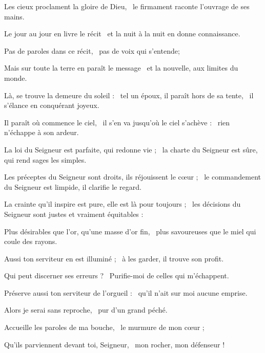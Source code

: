 \item Les cieux proclament la gloire de Dieu,~\psstar{} le firmament raconte l'ouvrage de ses mains.
\item Le jour au jour en livre le récit~\psstar{} et la nuit à la nuit en donne connaissance.
\item Pas de paroles dans ce récit,~\psstar{} pas de voix qui s'entende;
\item Mais sur toute la terre en paraît le message~\psstar{} et la nouvelle, aux limites du monde. 
\item Là, se trouve la demeure du soleil :~\pscross{} tel un époux, il paraît hors de sa tente,~\psstar{} il s'élance en conquérant joyeux.
\item Il paraît où commence le ciel,~\pscross{} il s'en va jusqu'où le ciel s'achève :~\psstar{} rien n'échappe à son ardeur.
\item La loi du Seigneur est parfaite, qui redonne vie ;~\psstar{} la charte du Seigneur est sûre, qui rend sages les simples.
\item Les préceptes du Seigneur sont droits, ils réjouissent le cœur ;~\psstar{} le commandement du Seigneur est limpide, il clarifie le regard.
\item La crainte qu'il inspire est pure, elle est là pour toujours ;~\psstar{} les décisions du Seigneur sont justes et vraiment équitables :
\item Plus désirables que l'or, qu'une masse d'or fin,~\psstar{} plus savoureuses que le miel qui coule des rayons.
\item Aussi ton serviteur en est illuminé ;~\psstar{} à les garder, il trouve son profit.
\item Qui peut discerner ses erreurs ?~\psstar{} Purifie-moi de celles qui m'échappent.
\item Préserve aussi ton serviteur de l'orgueil :~\psstar{} qu'il n'ait sur moi aucune emprise.
\item Alors je serai sans reproche,~\psstar{} pur d'un grand péché.
\item Accueille les paroles de ma bouche,~\psstar{} le murmure de mon cœur ;
\item Qu'ils parviennent devant toi, Seigneur,~\psstar{} mon rocher, mon défenseur !
